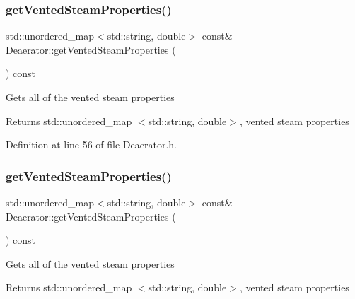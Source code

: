 \mbox{\label{class_deaerator_aba77ebc41e5b05d6e2463793bacbcbc0}} 
\subsubsection{\texorpdfstring{get\+Vented\+Steam\+Properties()}{getVentedSteamProperties()}\hspace{0.1cm}{\footnotesize\ttfamily [2/3]}}
{\footnotesize\ttfamily std\+::unordered\+\_\+map$<$std\+::string, double$>$ const\& Deaerator\+::get\+Vented\+Steam\+Properties (\begin{DoxyParamCaption}{ }\end{DoxyParamCaption}) const\hspace{0.3cm}{\ttfamily [inline]}}

Gets all of the vented steam properties \begin{DoxyReturn}{Returns}
std\+::unordered\+\_\+map $<$std\+::string, double$>$, vented steam properties 
\end{DoxyReturn}


Definition at line 56 of file Deaerator.\+h.

\mbox{\label{class_deaerator_aba77ebc41e5b05d6e2463793bacbcbc0}} 
\subsubsection{\texorpdfstring{get\+Vented\+Steam\+Properties()}{getVentedSteamProperties()}\hspace{0.1cm}{\footnotesize\ttfamily [3/3]}}
{\footnotesize\ttfamily std\+::unordered\+\_\+map$<$std\+::string, double$>$ const\& Deaerator\+::get\+Vented\+Steam\+Properties (\begin{DoxyParamCaption}{ }\end{DoxyParamCaption}) const\hspace{0.3cm}{\ttfamily [inline]}}

Gets all of the vented steam properties \begin{DoxyReturn}{Returns}
std\+::unordered\+\_\+map $<$std\+::string, double$>$, vented steam properties 
\end{DoxyReturn}


